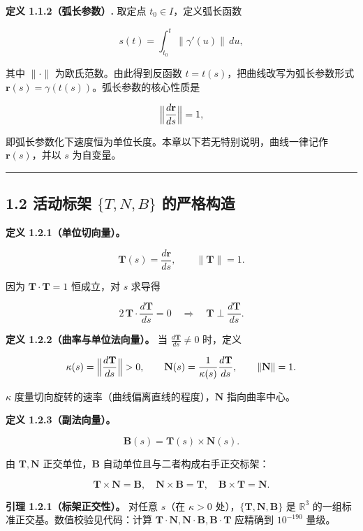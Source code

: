 \textbf{定义 1.1.2（弧长参数）.} 取定点 \(t_0\in I\)，定义弧长函数

\[
s(t)=\int_{t_0}^{t}\bigl\|\gamma'(u)\bigr\|\,du,
\]

其中 \(\|\cdot\|\) 为欧氏范数。由此得到反函数
\(t=t(s)\)，把曲线改写为弧长参数形式
\(\mathbf{r}(s)=\gamma(t(s))\)。弧长参数的核心性质是

\[
\Bigl\|\frac{d\mathbf{r}}{ds}\Bigr\|=1,
\]

即弧长参数化下速度恒为单位长度。本章以下若无特别说明，曲线一律记作
\(\mathbf{r}(s)\)，并以 \(s\) 为自变量。

\begin{center}\rule{0.5\linewidth}{0.5pt}\end{center}

\subsection{\texorpdfstring{1.2 活动标架 \(\{T,N,B\}\)
的严格构造}{1.2 活动标架 \textbackslash\{T,N,B\textbackslash\} 的严格构造}}\label{ux6d3bux52a8ux6807ux67b6-tnb-ux7684ux4e25ux683cux6784ux9020}

\textbf{定义 1.2.1（单位切向量）。}

\[
\mathbf{T}(s)=\frac{d\mathbf{r}}{ds},\qquad \|\mathbf{T}\|=1.
\]

因为 \(\mathbf{T}\cdot\mathbf{T}=1\) 恒成立，对 \(s\) 求导得

\[
2\,\mathbf{T}\cdot\frac{d\mathbf{T}}{ds}=0\quad\Longrightarrow\quad \mathbf{T}\perp \frac{d\mathbf{T}}{ds}.
\]

\textbf{定义 1.2.2（曲率与单位法向量）。} 当
\(\frac{d\mathbf{T}}{ds}\neq 0\) 时，定义

\[
\kappa(s)=\Bigl\|\frac{d\mathbf{T}}{ds}\Bigr\|>0,\qquad
\mathbf{N}(s)=\frac{1}{\kappa(s)}\frac{d\mathbf{T}}{ds},\qquad \|\mathbf{N}\|=1.
\]

\(\kappa\) 度量切向旋转的速率（曲线偏离直线的程度），\(\mathbf{N}\)
指向曲率中心。

\textbf{定义 1.2.3（副法向量）。}

\[
\mathbf{B}(s)=\mathbf{T}(s)\times\mathbf{N}(s).
\]

由 \(\mathbf{T},\mathbf{N}\) 正交单位，\(\mathbf{B}\)
自动单位且与二者构成右手正交标架：

\[
\mathbf{T}\times\mathbf{N}=\mathbf{B},\quad \mathbf{N}\times\mathbf{B}=\mathbf{T},\quad \mathbf{B}\times\mathbf{T}=\mathbf{N}.
\]

\textbf{引理 1.2.1（标架正交性）。} 对任意 \(s\)（在 \(\kappa>0\)
处），\(\{\mathbf{T},\mathbf{N},\mathbf{B}\}\) 是 \(\mathbb{R}^3\)
的一组标准正交基。数值校验见代码：计算
\(\mathbf{T}\cdot\mathbf{N},\mathbf{N}\cdot\mathbf{B},\mathbf{B}\cdot\mathbf{T}\)
应精确到 \(10^{-190}\) 量级。

